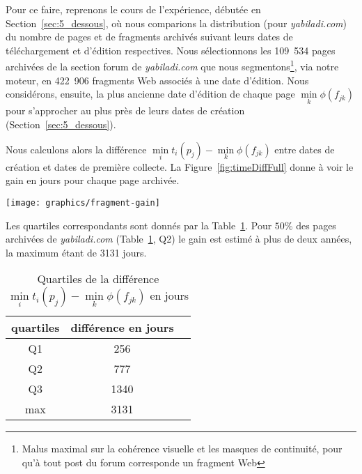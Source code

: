 \documentclass[symmetric,justified,marginals=raggedouter]{tufte-book}
\begin{document}
Pour ce faire, reprenons le cours de l'expérience,  débutée en Section~\ref{sec:5_dessous}, où nous comparions la distribution (pour \textit{yabiladi.com}) du nombre de pages et de fragments archivés suivant leurs dates de téléchargement et d'édition respectives. Nous sélectionnons les 109~534 pages archivées de la section forum de \textit{yabiladi.com} que nous segmentons\footnote{\RaggedOuter Malus maximal sur la cohérence visuelle et les masques de continuité, pour qu'à tout post du forum corresponde un fragment Web}, via notre moteur, en 422~906 fragments Web associés à une date d'édition. Nous considérons, ensuite, la plus ancienne date d'édition de chaque page $\min\limits_{k} \phi(f_{jk})$ pour s'approcher au plus près de leurs dates de création (Section~\ref{sec:5_dessous}). 

Nous calculons alors la différence $\min\limits_{i} t_i(p_j) - \min\limits_{k} \phi(f_{jk})$  entre dates de création et dates de première collecte. La Figure~\ref{fig:timeDiffFull} donne à voir le gain en jours pour chaque page archivée. 

\begin{figure*}%
  \texttt{[image: graphics/fragment-gain]}
  \caption{Distribution de la différence $\min\limits_{i} t_i(p_j) - \min\limits_{k} \phi(f_{jk})$ en jours}
  \label{fig:timeDiffFull}
\end{figure*}

\newpage

\noindent Les quartiles correspondants sont donnés par la Table~\ref{tab:quartiles_1}. Pour $50\%$ des pages archivées de \textit{yabiladi.com} (Table~\ref{tab:quartiles_1}, Q2) le gain est estimé à plus de deux années, la maximum étant de 3131 jours.

\begin{table}
\centering
\hspace{2em}%
  \label{tab:quartiles_1}
  \begin{tabular}{ccl}
    \toprule
    quartiles&différence en jours\\
    \midrule
    Q1 & 256\\
    Q2 & 777\\
    Q3 & 1340\\    
    max & 3131\\  
  \bottomrule
\end{tabular}
  \bigskip
  \caption{Quartiles de la différence $\min\limits_{i} t_i(p_j) - \min\limits_{k} \phi(f_{jk})$ en jours}
\end{table} 
\end{document}
